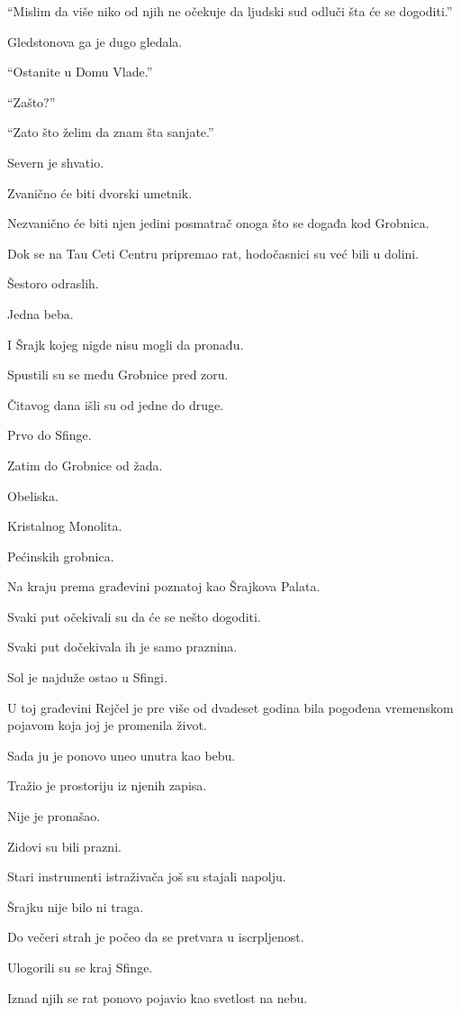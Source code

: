 ``Mislim da više niko od njih ne očekuje da ljudski sud odluči šta će se dogoditi.''

Gledstonova ga je dugo gledala.

``Ostanite u Domu Vlade.''

``Zašto?''

``Zato što želim da znam šta sanjate.''

Severn je shvatio.

Zvanično će biti dvorski umetnik.

Nezvanično će biti njen jedini posmatrač onoga što se događa kod Grobnica.

\bigskip

Dok se na Tau Ceti Centru pripremao rat, hodočasnici su već bili u dolini.

Šestoro odraslih.

Jedna beba.

I Šrajk kojeg nigde nisu mogli da pronađu.

Spustili su se među Grobnice pred zoru.

Čitavog dana išli su od jedne do druge.

Prvo do Sfinge.

Zatim do Grobnice od žada.

Obeliska.

Kristalnog Monolita.

Pećinskih grobnica.

Na kraju prema građevini poznatoj kao Šrajkova Palata.

Svaki put očekivali su da će se nešto dogoditi.

Svaki put dočekivala ih je samo praznina.

Sol je najduže ostao u Sfingi.

U toj građevini Rejčel je pre više od dvadeset godina bila pogođena vremenskom pojavom koja joj je promenila život.

Sada ju je ponovo uneo unutra kao bebu.

Tražio je prostoriju iz njenih zapisa.

Nije je pronašao.

Zidovi su bili prazni.

Stari instrumenti istraživača još su stajali napolju.

Šrajku nije bilo ni traga.

Do večeri strah je počeo da se pretvara u iscrpljenost.

Ulogorili su se kraj Sfinge.

Iznad njih se rat ponovo pojavio kao svetlost na nebu.

